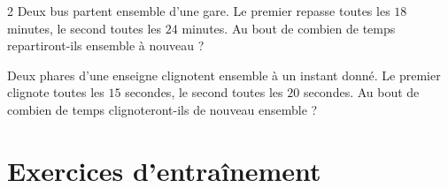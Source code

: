 \begin{multicols}{2}
\exo{} Deux bus partent ensemble d'une gare. Le premier repasse toutes les $18$
minutes, le second toutes les $24$ minutes. Au bout de combien de temps repartiront-ils
ensemble à nouveau ?

\exo{} Deux phares d'une enseigne clignotent ensemble à un instant donné. Le
premier clignote toutes les $15$ secondes, le second toutes les $20$ secondes. Au bout de
combien de temps clignoteront-ils de nouveau ensemble ?

\end{multicols}

\section{Exercices d'entraînement}
